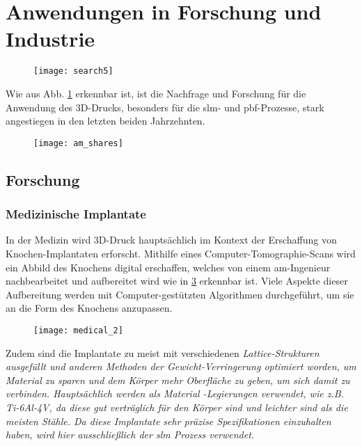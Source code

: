 \documentclass[../main.tex]{subfiles}
\begin{document}
\section{Anwendungen in Forschung und Industrie}
\begin{figure}[H]
	\centering
	\texttt{[image: search5]}
	\label{img:search_5}
\end{figure}
Wie aus Abb. \ref{img:search_5} erkennbar ist, ist die Nachfrage und Forschung für die Anwendung des 3D-Drucks, besonders für die \acrlong{slm}- und \acrfull{pbf}-Prozesse, stark angestiegen in den letzten beiden Jahrzehnten.

\begin{figure}[H]
	\centering
	\texttt{[image: am\_shares]}
	\label{img:am_shares}
\end{figure} 
\subsection{Forschung}
\subsubsection{Medizinische Implantate}
In der Medizin wird 3D-Druck hauptsächlich im Kontext der Erschaffung von Knochen-Implantaten erforscht. Mithilfe eines Computer-Tomographie-Scans wird ein Abbild des Knochens digital erschaffen, welches von einem \acrshort{am}-Ingenieur nachbearbeitet und aufbereitet wird wie in \ref{img:medical} erkennbar ist. Viele Aspekte dieser Aufbereitung werden mit Computer-gestützten Algorithmen durchgeführt, um sie an die Form des Knochens anzupassen.

\begin{figure}[H]
	\centering
	\texttt{[image: medical\_2]}
	\label{img:medical}
\end{figure} 
Zudem sind die Implantate zu meist mit verschiedenen \it{Lattice}-Strukturen ausgefüllt und anderen Methoden der Gewicht-Verringerung optimiert worden, um Material zu sparen und dem Körper mehr Oberfläche zu geben, um sich damit zu verbinden. Hauptsächlich werden als Material -Legierungen verwendet, wie z.B. Ti-6Al-4V, da diese gut verträglich für den Körper sind und leichter sind als die meisten Stähle.
Da diese Implantate sehr präzise Spezifikationen einzuhalten haben, wird hier ausschließlich der \acrlong{slm} Prozess verwendet.
\end{document}
